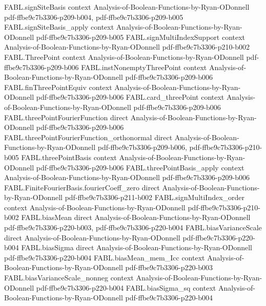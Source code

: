 \begin{theorem}
  {FABL.signSiteBasis}
  {context}
  {Analysis-of-Boolean-Functions-by-Ryan-ODonnell}
  {pdf-ffbe9c7b3306-p209-b004,
    pdf-ffbe9c7b3306-p209-b005}
\proofstep
  {FABL.signSiteBasis_apply}
  {context}
  {Analysis-of-Boolean-Functions-by-Ryan-ODonnell}
  {pdf-ffbe9c7b3306-p209-b005}
\proofstep
  {FABL.signMultiIndexSupport}
  {context}
  {Analysis-of-Boolean-Functions-by-Ryan-ODonnell}
  {pdf-ffbe9c7b3306-p210-b002}
\proofstep
  {FABL.ThreePoint}
  {context}
  {Analysis-of-Boolean-Functions-by-Ryan-ODonnell}
  {pdf-ffbe9c7b3306-p209-b006}
\proofstep
  {FABL.instNonemptyThreePoint}
  {context}
  {Analysis-of-Boolean-Functions-by-Ryan-ODonnell}
  {pdf-ffbe9c7b3306-p209-b006}
\proofstep
  {FABL.finThreePointEquiv}
  {context}
  {Analysis-of-Boolean-Functions-by-Ryan-ODonnell}
  {pdf-ffbe9c7b3306-p209-b006}
\proofstep
  {FABL.card_threePoint}
  {context}
  {Analysis-of-Boolean-Functions-by-Ryan-ODonnell}
  {pdf-ffbe9c7b3306-p209-b006}
\proofstep
  {FABL.threePointFourierFunction}
  {direct}
  {Analysis-of-Boolean-Functions-by-Ryan-ODonnell}
  {pdf-ffbe9c7b3306-p209-b006}
\proofstep
  {FABL.threePointFourierFunction_orthonormal}
  {direct}
  {Analysis-of-Boolean-Functions-by-Ryan-ODonnell}
  {pdf-ffbe9c7b3306-p209-b006,
    pdf-ffbe9c7b3306-p210-b005}
\proofstep
  {FABL.threePointBasis}
  {context}
  {Analysis-of-Boolean-Functions-by-Ryan-ODonnell}
  {pdf-ffbe9c7b3306-p209-b006}
\proofstep
  {FABL.threePointBasis_apply}
  {context}
  {Analysis-of-Boolean-Functions-by-Ryan-ODonnell}
  {pdf-ffbe9c7b3306-p209-b006}
\proofstep
  {FABL.FiniteFourierBasis.fourierCoeff_zero}
  {direct}
  {Analysis-of-Boolean-Functions-by-Ryan-ODonnell}
  {pdf-ffbe9c7b3306-p211-b002}
\proofstep
  {FABL.signMultiIndex_order}
  {context}
  {Analysis-of-Boolean-Functions-by-Ryan-ODonnell}
  {pdf-ffbe9c7b3306-p210-b002}
\proofstep
  {FABL.biasMean}
  {direct}
  {Analysis-of-Boolean-Functions-by-Ryan-ODonnell}
  {pdf-ffbe9c7b3306-p220-b003,
    pdf-ffbe9c7b3306-p220-b004}
\proofstep
  {FABL.biasVarianceScale}
  {direct}
  {Analysis-of-Boolean-Functions-by-Ryan-ODonnell}
  {pdf-ffbe9c7b3306-p220-b004}
\proofstep
  {FABL.biasSigma}
  {direct}
  {Analysis-of-Boolean-Functions-by-Ryan-ODonnell}
  {pdf-ffbe9c7b3306-p220-b004}
\proofstep
  {FABL.biasMean_mem_Icc}
  {context}
  {Analysis-of-Boolean-Functions-by-Ryan-ODonnell}
  {pdf-ffbe9c7b3306-p220-b003}
\proofstep
  {FABL.biasVarianceScale_nonneg}
  {context}
  {Analysis-of-Boolean-Functions-by-Ryan-ODonnell}
  {pdf-ffbe9c7b3306-p220-b004}
\proofstep
  {FABL.biasSigma_sq}
  {context}
  {Analysis-of-Boolean-Functions-by-Ryan-ODonnell}
  {pdf-ffbe9c7b3306-p220-b004}

\end{theorem}
